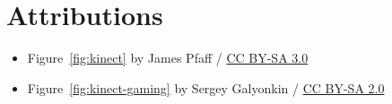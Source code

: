\chapter{Attributions}

\begin{itemize}
\item Figure~\ref{fig:kinect} by James Pfaff / \href{http://creativecommons.org/licenses/by-sa/3.0/}{CC BY-SA 3.0}
\item Figure~\ref{fig:kinect-gaming} by Sergey Galyonkin / \href{https://creativecommons.org/licenses/by-sa/2.0/}{CC BY-SA 2.0}
\end{itemize}
